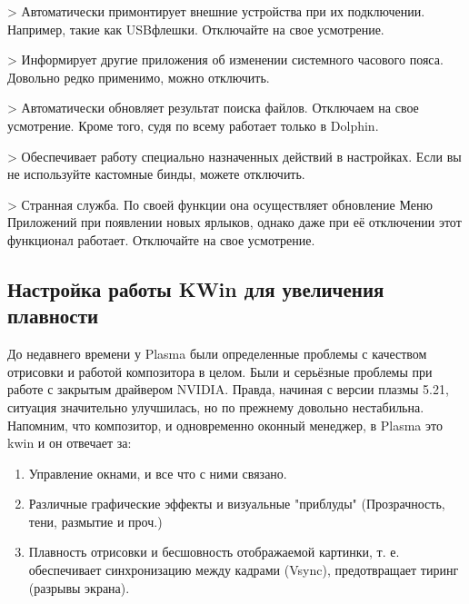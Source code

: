 \documentclass[letterpaper,10pt,russian,openany]{sphinxmanual}
\begin{document}
\sphinxAtStartPar
{} \sphinxhyphen{}> Автоматически примонтирует внешние устройства при их подключении.
Например, такие как USB\sphinxhyphen{}флешки. Отключайте на свое усмотрение.

\sphinxAtStartPar
{} \sphinxhyphen{}> Информирует другие приложения об изменении  системного часового пояса.
Довольно редко применимо, можно отключить.

\sphinxAtStartPar
{} \sphinxhyphen{}> Автоматически обновляет результат поиска файлов.
Отключаем на свое усмотрение. Кроме того, судя по всему работает только в Dolphin.

\sphinxAtStartPar
{} \sphinxhyphen{}> Обеспечивает работу специально назначенных действий в настройках.
Если вы не используйте кастомные бинды, можете отключить.

\sphinxAtStartPar
{} \sphinxhyphen{}> Странная служба.
По своей функции она осуществляет обновление Меню Приложений при появлении новых ярлыков,
однако даже при её отключении этот функционал работает.
Отключайте на свое усмотрение.

\ignorespaces 

\subsection{Настройка работы KWin для увеличения плавности}
\label{\detokenize{source/de-optimizations:kwin}}\label{\detokenize{source/de-optimizations:lowlatency-kwin}}\label{\detokenize{source/de-optimizations:index-13}}
\sphinxAtStartPar
До недавнего времени у Plasma были определенные проблемы с качеством отрисовки и работой композитора в целом.
Были и серьёзные проблемы при работе с закрытым драйвером NVIDIA. Правда, начиная с версии плазмы 5.21, ситуация значительно улучшилась,
но по прежнему довольно нестабильна.
Напомним, что композитор, и одновременно оконный менеджер, в Plasma это kwin \sphinxhyphen{} и он отвечает за:
\begin{enumerate}
%
\item {} 
\sphinxAtStartPar
Управление окнами, и все что с ними связано.

\item {} 
\sphinxAtStartPar
Различные графические эффекты и визуальные "приблуды" (Прозрачность, тени, размытие и проч.)

\item {} 
\sphinxAtStartPar
Плавность отрисовки и бесшовность отображаемой картинки, т. е. обеспечивает синхронизацию между кадрами (Vsync), предотвращает тиринг (разрывы экрана).

\end{enumerate}
\end{document}
